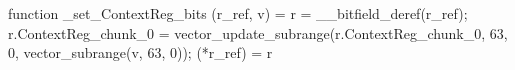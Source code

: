 function _set_ContextReg_bits (r_ref, v) = {
    r = __bitfield_deref(r_ref);
    r.ContextReg_chunk_0 = vector_update_subrange(r.ContextReg_chunk_0, 63, 0, vector_subrange(v, 63, 0));
    (*r_ref) = r
}
